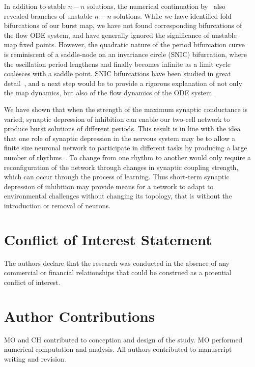 \documentclass[utf8]{frontiersFPHY} %
\begin{document}
In addition to stable $n-n$ solutions, the numerical continuation by~\citet{bose2011} also revealed branches of unstable $n-n$ solutions.
While we have identified fold bifurcations of our burst map, we have not found corresponding bifurcations of the flow ODE system, and have generally ignored the significance of unstable map fixed points.
However, the quadratic nature of the period bifurcation curve is reminiscent of a saddle-node on an invariance circle (SNIC) bifurcation, where the oscillation period lengthens and finally becomes infinite as a limit cycle coalesces with a saddle point.
SNIC bifurcations have been studied in great detail~\cite[e.g.][]{ermentrout1986}, and a next step would be to provide a rigorous explanation of not only the map dynamics, but also of the flow dynamics of the ODE system.

We have shown that when the strength of the maximum synaptic conductance is varied, synaptic depression of inhibition can enable our two-cell network to produce burst solutions of different periods.
This result is in line with the idea that one role of synaptic depression in the nervous system may be to allow a finite size neuronal network to participate in different tasks by producing a large number of rhythms~\citep{bose2011, jalil2004, li2007}.
To change from one rhythm to another would only require a reconfiguration of the network through changes in synaptic coupling strength, which can occur through the process of learning.
Thus short-term synaptic depression of inhibition may provide means for a network to adapt to environmental challenges without changing its topology, that is without the introduction or removal of neurons.


\section*{Conflict of Interest Statement}
The authors declare that the research was conducted in the absence of any commercial or financial relationships that could be construed as a potential conflict of interest.

\section*{Author Contributions}
MO and CH contributed to conception and design of the study.
MO performed numerical computation and analysis.
All authors contributed to manuscript writing and revision.
\end{document}
